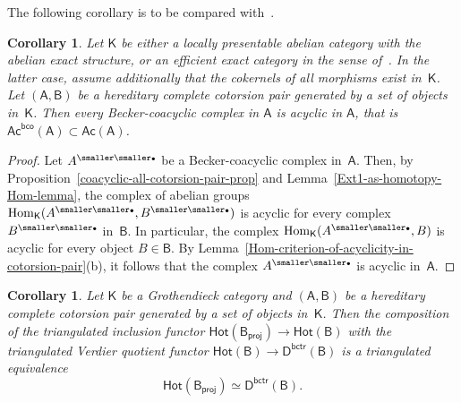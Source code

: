 \documentclass[12pt,a4paper]{amsart}
\newcommand{\+}{\nobreakdash-}
\renewcommand{\:}{\colon}
\newcommand{\rarrow}{\longrightarrow}
\newcommand{\bu}{{\text{\smaller\smaller$\scriptstyle\bullet$}}}
\DeclareMathOperator{\Hom}{Hom}
\newcommand{\sA}{\mathsf A}
\newcommand{\sB}{\mathsf B}
\newcommand{\sD}{\mathsf D}
\newcommand{\sK}{\mathsf K}
\newcommand{\Hot}{\mathsf{Hot}}
\newcommand{\Ac}{\mathsf{Ac}}
\newcommand{\proj}{\mathsf{proj}}
\newcommand{\bco}{\mathsf{bco}}
\newcommand{\bctr}{\mathsf{bctr}}
\theoremstyle{plain}
\newtheorem{cor}[thm]{Corollary}
\theoremstyle{definition}
\begin{document}
 The following corollary is to be compared with~\cite[Lemma~B.7.3(a)
and Remark~B.7.4]{Pcosh}.

\begin{cor} \label{coacyclic-in-A-are-acyclic-in-A}
 Let\/ $\sK$ be either a locally presentable abelian category with
the abelian exact structure, or an efficient exact category in
the sense of\/~\cite{Sto-ICRA}.
 In the latter case, assume additionally that the cokernels of all
morphisms exist in\/~$\sK$.
 Let $(\sA,\sB)$ be a hereditary complete cotorsion pair generated
by a set of objects in\/~$\sK$.
 Then every Becker-coacyclic complex in\/ $\sA$ is acyclic in\/ $\sA$,
that is\/ $\Ac^\bco(\sA)\subset\Ac(\sA)$.
\end{cor}

\begin{proof}
 Let $A^\bu$ be a Becker-coacyclic complex in~$\sA$.
 Then, by Proposition~\ref{coacyclic-all-cotorsion-pair-prop} and
Lemma~\ref{Ext1-as-homotopy-Hom-lemma}, the complex of abelian groups
$\Hom_\sK(A^\bu,B^\bu)$ is acyclic for every complex $B^\bu$ in~$\sB$.
 In particular, the complex $\Hom_\sK(A^\bu,B)$ is acyclic for every
object $B\in\sB$.
 By Lemma~\ref{Hom-criterion-of-acyclicity-in-cotorsion-pair}(b), it
follows that the complex $A^\bu$ is acyclic in~$\sA$.
\end{proof}

\begin{cor} \label{contraderived-of-B-well-behaved}
 Let\/ $\sK$ be a Grothendieck category and $(\sA,\sB)$ be a hereditary
complete cotorsion pair generated by a set of objects in\/~$\sK$.
 Then the composition of the triangulated inclusion functor\/
$\Hot(\sB_\proj)\rarrow\Hot(\sB)$ with the triangulated Verdier
quotient functor\/ $\Hot(\sB)\rarrow\sD^\bctr(\sB)$ is a triangulated
equivalence
$$
 \Hot(\sB_\proj)\simeq\sD^\bctr(\sB).
$$
\end{cor}
\end{document}
